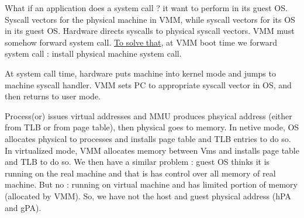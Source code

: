 \documentclass[12pt,a4paper]{article}
\begin{document}
 What if an application does a system call ? it want to perform in its guest OS. Syscall vectors for the physical machine in VMM, while syscall vectors for its OS in its guest OS. Hardware directs syscalls to physical syscall vectors. VMM must somehow forward system call. \uline{To solve that}, at VMM boot time we forward system call : install physical machine system call. 

At system call time, hardware puts machine into kernel mode and jumps to machine syscall handler. VMM sets PC to appropriate syscall vector in OS, and then returns to user mode. 

 Process(or) issues virtual addresses and MMU produces phsyical address (either from TLB or from page table), then physical goes to memory. In netive mode, OS allocates physical to processes and installs page table and TLB entries to do so. In virtualized mode, VMM allocates memory between Vms and installs page table and TLB to do so. We then have a similar problem : guest OS thinks it is running on the real machine and that is has control over all memory of real machine. But no : running on virtual machine and has limited portion of memory (allocated by VMM). So, we have not the host and guest physical address (hPA and gPA). 
\end{document}
